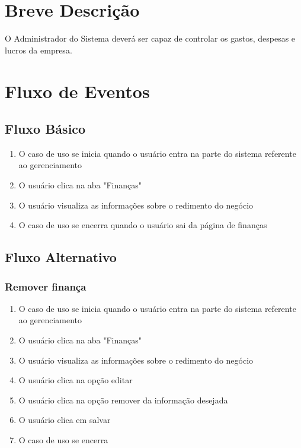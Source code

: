 \section{Breve Descrição}

O Administrador do Sistema deverá ser capaz de controlar os gastos, despesas e lucros da empresa.

\section{Fluxo de Eventos}
\subsection{Fluxo Básico}

\begin{enumerate}
	\item O caso de uso se inicia quando o usuário entra na parte do sistema referente ao gerenciamento
	\item O usuário clica na aba "Finanças"
	\item O usuário visualiza as informações sobre o redimento do negócio
	\item O caso de uso se encerra quando o usuário sai da página de finanças
\end{enumerate}

\subsection{Fluxo Alternativo}
\subsubsection{Remover finança}
\begin{enumerate}
	\item O caso de uso se inicia quando o usuário entra na parte do sistema referente ao gerenciamento
	\item O usuário clica na aba "Finanças"
	\item O usuário visualiza as informações sobre o redimento do negócio
	\item O usuário clica na opção editar
	\item O usuário clica na opção remover da informação desejada
	\item O usuário clica em salvar
	\item O caso de uso se encerra
\end{enumerate}

